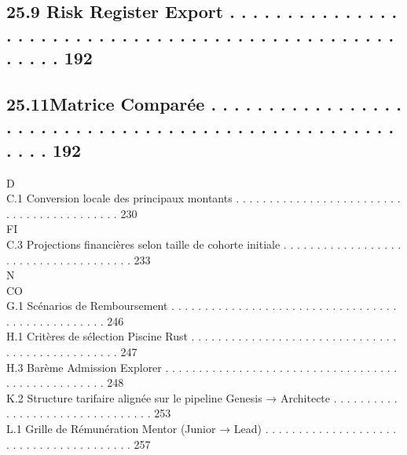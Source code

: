 \documentclass[12pt,landscape,a4paper]{article}
\begin{document}
\subsection{25.9 Risk Register Export . . . . . . . . . . . . . . . . . . . . . . . . . . . . . . . . . . . . . . . . . . . . . . . . . . . . . . 192}
\subsection{25.11Matrice Comparée . . . . . . . . . . . . . . . . . . . . . . . . . . . . . . . . . . . . . . . . . . . . . . . . . . . . . . . 192}
\vspace{0.5em}
\vspace{0.5em}
\vspace{0.5em}
\vspace{0.5em}
D\\
C.1 Conversion locale des principaux montants . . . . . . . . . . . . . . . . . . . . . . . . . . . . . . . . . . . . . . . . . . 230\\
\vspace{0.5em}
\vspace{0.5em}
\vspace{0.5em}
\vspace{0.5em}
FI\\
C.3 Projections financières selon taille de cohorte initiale . . . . . . . . . . . . . . . . . . . . . . . . . . . . . . . . . . . . . 233\\
\vspace{0.5em}
N\\
CO\\
G.1 Scénarios de Remboursement        . . . . . . . . . . . . . . . . . . . . . . . . . . . . . . . . . . . . . . . . . . . . . . . . . 246\\
\vspace{0.5em}
H.1 Critères de sélection Piscine Rust . . . . . . . . . . . . . . . . . . . . . . . . . . . . . . . . . . . . . . . . . . . . . . . . 247\\
H.3 Barème Admission Explorer . . . . . . . . . . . . . . . . . . . . . . . . . . . . . . . . . . . . . . . . . . . . . . . . . . 248\\
\vspace{0.5em}
K.2 Structure tarifaire alignée sur le pipeline Genesis → Architecte . . . . . . . . . . . . . . . . . . . . . . . . . . . . . . . . 253\\
\vspace{0.5em}
L.1 Grille de Rémunération Mentor (Junior → Lead) . . . . . . . . . . . . . . . . . . . . . . . . . . . . . . . . . . . . . . . 257\\
\end{document}
